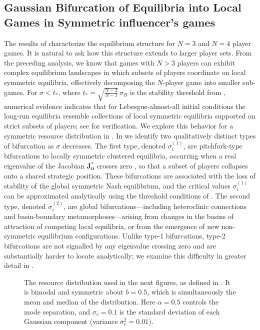 \documentclass{article}
\begin{document}
        \subsection{Gaussian Bifurcation of Equilibria into Local Games in Symmetric influencer's games}
            The results of  characterize the equilibrium structure for $N = 3$ and $N = 4$ player games. It is natural to ask how this structure extends to larger player sets. From the preceding analysis, we know that games with $N > 3$ players can exhibit complex equilibrium landscapes in which subsets of players coordinate on local symmetric equilibria, effectively decomposing the $N$-player game into smaller sub-games. For $\sigma < t_*$, where $t_* = \sqrt{\frac{N-2}{N-1}}\,\sigma_B$ is the stability threshold from , numerical evidence indicates that for Lebesgue-almost-all initial conditions the long-run equilibria resemble collections of local symmetric equilibria supported on strict subsets of players; see  for verification. We explore this behavior for a symmetric resource distribution in . In  we identify two qualitatively distinct types of bifurcation as $\sigma$ decreases. The first type, denoted $\sigma_i^{(1)}$, are pitchfork-type bifurcations \cite{perko2001differential} to locally symmetric clustered equilibria, occurring when a real eigenvalue of the Jacobian $\mathbf{J}_{\mathbf{u}}^*$ crosses zero \cite{khalil2002nonlinear}, so that a subset of players collapses onto a shared strategic position. These bifurcations are associated with the loss of stability of the global symmetric Nash equilibrium, and the critical values $\sigma_i^{(1)}$ can be approximated analytically using the threshold conditions of . The second type, denoted $\sigma_i^{(2)}$, are global bifurcations---including heteroclinic connections and basin-boundary metamorphoses---arising from changes in the basins of attraction of competing local equilibria, or from the emergence of new non-symmetric equilibrium configurations. Unlike type-1 bifurcations, type-2 bifurcations are not signalled by any eigenvalue crossing zero and are substantially harder to locate analytically; we examine this difficulty in greater detail in .
            \begin{figure}[ht!]
                \centering
                
                \caption{The resource distribution used in the next figures, as defined in . It is bimodal and symmetric about $b=0.5$, which is simultaneously the mean and median of the distribution. Here $\alpha=0.5$ controls the mode separation, and $\sigma_r=0.1$ is the standard deviation of each Gaussian component (variance $\sigma_r^2 = 0.01$).}
                \label{fig:bifurc_local_games:a}
            \end{figure}
\end{document}
